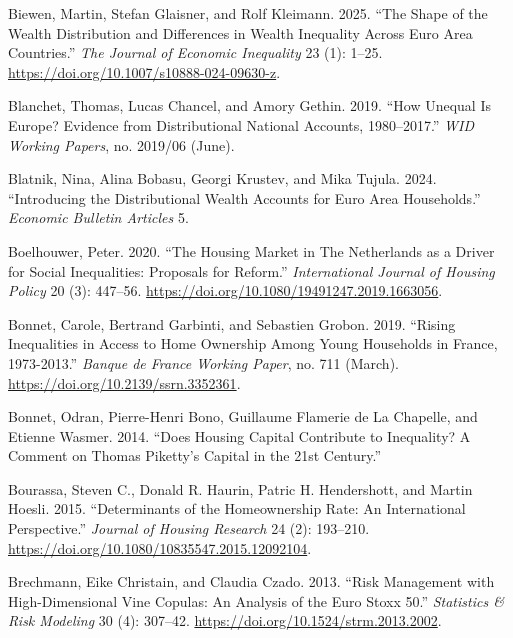 \documentclass[
  a4paper,
  DIV=11,
  numbers=noendperiod]{scrartcl}
\newlength{\cslhangindent}
\newenvironment{CSLReferences}[2] %
 {\begin{list}{}{%
  \setlength{\itemindent}{0pt}
  \setlength{\leftmargin}{0pt}
  \setlength{\parsep}{0pt}
  \ifodd #1
   \setlength{\leftmargin}{\cslhangindent}
   \setlength{\itemindent}{-1\cslhangindent}
  \fi
  \setlength{\itemsep}{#2\baselineskip}}}
 {\end{list}}
\begin{document}
\begin{CSLReferences}{1}{0}
Biewen, Martin, Stefan Glaisner, and Rolf Kleimann. 2025. {``The Shape
of the Wealth Distribution and Differences in Wealth Inequality Across
{Euro} Area Countries.''} \emph{The Journal of Economic Inequality} 23
(1): 1--25. \url{https://doi.org/10.1007/s10888-024-09630-z}.

Blanchet, Thomas, Lucas Chancel, and Amory Gethin. 2019. {``How {Unequal
Is Europe}? {Evidence} from {Distributional National Accounts},
1980--2017.''} \emph{WID Working Papers}, no. 2019/06 (June).

Blatnik, Nina, Alina Bobasu, Georgi Krustev, and Mika Tujula. 2024.
{``Introducing the {Distributional Wealth Accounts} for Euro Area
Households.''} \emph{Economic Bulletin Articles} 5.

Boelhouwer, Peter. 2020. {``The Housing Market in {The Netherlands} as a
Driver for Social Inequalities: Proposals for Reform.''}
\emph{International Journal of Housing Policy} 20 (3): 447--56.
\url{https://doi.org/10.1080/19491247.2019.1663056}.

Bonnet, Carole, Bertrand Garbinti, and Sebastien Grobon. 2019. {``Rising
{Inequalities} in {Access} to {Home Ownership} Among {Young Households}
in {France}, 1973-2013.''} \emph{Banque de France Working Paper}, no.
711 (March). \url{https://doi.org/10.2139/ssrn.3352361}.

Bonnet, Odran, Pierre-Henri Bono, Guillaume Flamerie de La Chapelle, and
Etienne Wasmer. 2014. {``Does Housing Capital Contribute to Inequality?
{A} Comment on {Thomas Piketty}'s {Capital} in the 21st {Century}.''}

Bourassa, Steven C., Donald R. Haurin, Patric H. Hendershott, and Martin
Hoesli. 2015. {``Determinants of the {Homeownership Rate}: {An
International Perspective}.''} \emph{Journal of Housing Research} 24
(2): 193--210. \url{https://doi.org/10.1080/10835547.2015.12092104}.

Brechmann, Eike Christain, and Claudia Czado. 2013. {``Risk Management
with High-Dimensional Vine Copulas: {An} Analysis of the {Euro Stoxx}
50.''} \emph{Statistics \& Risk Modeling} 30 (4): 307--42.
\url{https://doi.org/10.1524/strm.2013.2002}.


\end{CSLReferences}
\end{document}
